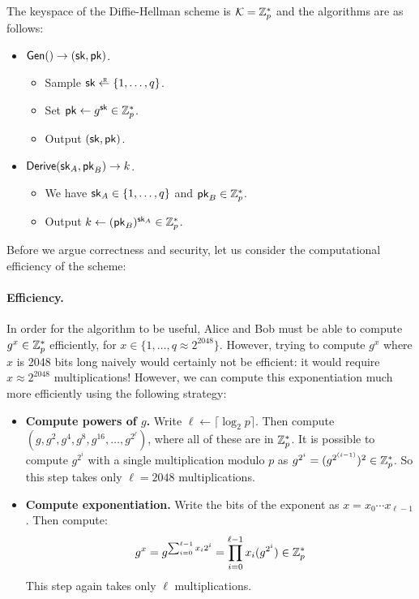 The keyspace of the Diffie-Hellman scheme is $\mathcal{K} = \mathbb{Z}^*_p$
and the algorithms are as follows:
\begin{itemize}[noitemsep]
  \item $\mathsf{Gen}() \to ({\mathsf{sk}}, \mathsf{pk})$.
    \begin{itemize}[noitemsep]
      \item Sample $\sk \getsr \{1, \dots, q\}$.
      \item Set $\mathsf{pk} \gets g^{{\mathsf{sk}}} \in \mathbb{Z}^*_p$.
      \item Output $({\mathsf{sk}}, \mathsf{pk})$.
    \end{itemize}

  \item $\mathsf{Derive}({\mathsf{sk}}_A, \mathsf{pk}_B) \to k$.
    \begin{itemize}[noitemsep]
      \item We have ${\mathsf{sk}}_A \in \{1, \dots, q\}$ and $\mathsf{pk}_B \in \mathbb{Z}^*_p$.
      \item Output $k \gets (\mathsf{pk}_B)^{{\mathsf{sk}}_A} \in \mathbb{Z}^*_p$.
    \end{itemize}
\end{itemize}

Before we argue correctness and security, let us consider
the computational efficiency of the scheme:

\paragraph{Efficiency.} In order for the algorithm to be useful,
Alice and Bob must be able to compute $g^x \in \mathbb{Z}^*_p$ efficiently,
for $x \in \{1, \dots, q \approx 2^{2048}\}$.
However, trying to compute $g^x$ where $x$ is 2048
bits long naively would certainly not be
efficient: it would require $x \approx 2^{2048}$ multiplications!
However, we can compute this exponentiation much more efficiently using
the following strategy:
\begin{itemize}[noitemsep]
  \item \textbf{Compute powers of $g$.}
        Write $\ell \gets \lceil \log_2 p \rceil$.
        Then compute $(g, g^2, g^4, g^{8}, g^{16}, \dots, g^{2^\ell})$,
        where all of these are in $\mathbb{Z}^*_p$.
        It is possible to compute $g^{2^{i}}$ with a single multiplication
        modulo $p$ as $g^{2^i} = (g^{2^{(i-1)}})^2 \in \mathbb{Z}^*_p$.
        So this step takes only $\ell = 2048$ multiplications.
  \item \textbf{Compute exponentiation.}
        Write the bits of the exponent as $x = x_0 \cdots x_{\ell-1}$.
        Then compute:
        \[ g^x = g^{\sum_{i = 0}^{\ell-1} x_i 2^i} = \prod_{i=0}^{\ell-1} x_i(g^{2^i}) \in \mathbb{Z}^*_p\] 
        This step again takes only $\ell$ multiplications.
\end{itemize}


